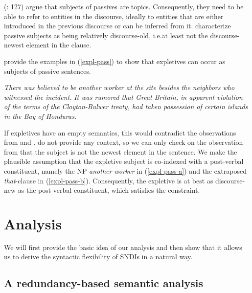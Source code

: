 \documentclass[output=paper]{langsci/langscibook}
\begin{document}
\citeauthor{Kuno:Takami:04} (\citeyear{Kuno:Takami:04}: 127) 
argue that subjects of  passives are topics. Consequently, they need to be able to refer to entities in the discourse, ideally to entities that are either introduced in the previous discourse or can be inferred from it. \cite{Ward:Birner:04} characterize passive subjects as being relatively discourse-old, i.e.\@ at least not the discourse-newest element in the clause.

\cite{kaysagidioms} provide the examples in (\ref{expl-pass}) to show that expletives can occur as subjects of passive sentences.

\begin{exe}
\ex\label{expl-pass}
\begin{xlist}
\ex \textit{There was believed to be another worker at the site besides the neighbors
who witnessed the incident.}\label{expl-pass-a}
\ex \textit{It was rumored that Great Britain, in apparent violation of the terms of
the Clayton-Bulwer treaty, had taken possession of certain islands in the
Bay of Honduras.} \label{expl-pass-b}
\end{xlist}
\end{exe}

If expletives have an empty semantics, this would contradict the observations from \cite{Kuno:Takami:04} and \cite{Ward:Birner:04}. \cite{kaysagidioms}  do not provide any context, so we can only check on the observation from \cite{Ward:Birner:04} that the subject is not the newest element in the sentence. We make the plausible assumption that the  expletive subject is co-indexed with a post-verbal constituent, namely the NP \textit{another worker} in (\ref{expl-pass-a}) and the extraposed \textit{that}-clause in (\ref{expl-pass-b}). Consequently, the expletive is at best as discourse-new as the post-verbal constituent, which satisfies the constraint.


\section{Analysis}
\label{Sec-Analysis}
\largerpage[-2]
We will first provide the basic idea of our analysis and then show that it allows us to derive the syntactic flexibility of SNDIs in a natural way.



\subsection{A redundancy-based semantic analysis}
\end{document}
